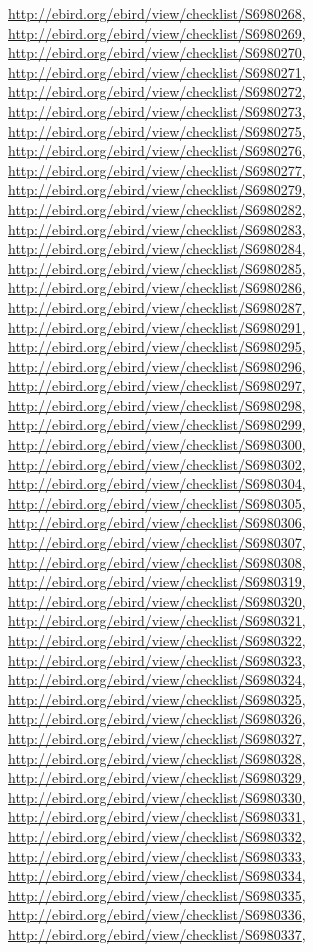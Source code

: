 \documentclass[9pt, article]{memoir}
\begin{document}
\begin{multicols}{2}
\url{http://ebird.org/ebird/view/checklist/S6980268}, 
\url{http://ebird.org/ebird/view/checklist/S6980269}, 
\url{http://ebird.org/ebird/view/checklist/S6980270}, 
\url{http://ebird.org/ebird/view/checklist/S6980271}, 
\url{http://ebird.org/ebird/view/checklist/S6980272}, 
\url{http://ebird.org/ebird/view/checklist/S6980273}, 
\url{http://ebird.org/ebird/view/checklist/S6980275}, 
\url{http://ebird.org/ebird/view/checklist/S6980276}, 
\url{http://ebird.org/ebird/view/checklist/S6980277}, 
\url{http://ebird.org/ebird/view/checklist/S6980279}, 
\url{http://ebird.org/ebird/view/checklist/S6980282}, 
\url{http://ebird.org/ebird/view/checklist/S6980283}, 
\url{http://ebird.org/ebird/view/checklist/S6980284}, 
\url{http://ebird.org/ebird/view/checklist/S6980285}, 
\url{http://ebird.org/ebird/view/checklist/S6980286}, 
\url{http://ebird.org/ebird/view/checklist/S6980287}, 
\url{http://ebird.org/ebird/view/checklist/S6980291}, 
\url{http://ebird.org/ebird/view/checklist/S6980295}, 
\url{http://ebird.org/ebird/view/checklist/S6980296}, 
\url{http://ebird.org/ebird/view/checklist/S6980297}, 
\url{http://ebird.org/ebird/view/checklist/S6980298}, 
\url{http://ebird.org/ebird/view/checklist/S6980299}, 
\url{http://ebird.org/ebird/view/checklist/S6980300}, 
\url{http://ebird.org/ebird/view/checklist/S6980302}, 
\url{http://ebird.org/ebird/view/checklist/S6980304}, 
\url{http://ebird.org/ebird/view/checklist/S6980305}, 
\url{http://ebird.org/ebird/view/checklist/S6980306}, 
\url{http://ebird.org/ebird/view/checklist/S6980307}, 
\url{http://ebird.org/ebird/view/checklist/S6980308}, 
\url{http://ebird.org/ebird/view/checklist/S6980319}, 
\url{http://ebird.org/ebird/view/checklist/S6980320}, 
\url{http://ebird.org/ebird/view/checklist/S6980321}, 
\url{http://ebird.org/ebird/view/checklist/S6980322}, 
\url{http://ebird.org/ebird/view/checklist/S6980323}, 
\url{http://ebird.org/ebird/view/checklist/S6980324}, 
\url{http://ebird.org/ebird/view/checklist/S6980325}, 
\url{http://ebird.org/ebird/view/checklist/S6980326}, 
\url{http://ebird.org/ebird/view/checklist/S6980327}, 
\url{http://ebird.org/ebird/view/checklist/S6980328}, 
\url{http://ebird.org/ebird/view/checklist/S6980329}, 
\url{http://ebird.org/ebird/view/checklist/S6980330}, 
\url{http://ebird.org/ebird/view/checklist/S6980331}, 
\url{http://ebird.org/ebird/view/checklist/S6980332}, 
\url{http://ebird.org/ebird/view/checklist/S6980333}, 
\url{http://ebird.org/ebird/view/checklist/S6980334}, 
\url{http://ebird.org/ebird/view/checklist/S6980335}, 
\url{http://ebird.org/ebird/view/checklist/S6980336}, 
\url{http://ebird.org/ebird/view/checklist/S6980337}, 

\end{multicols}
\end{document}
